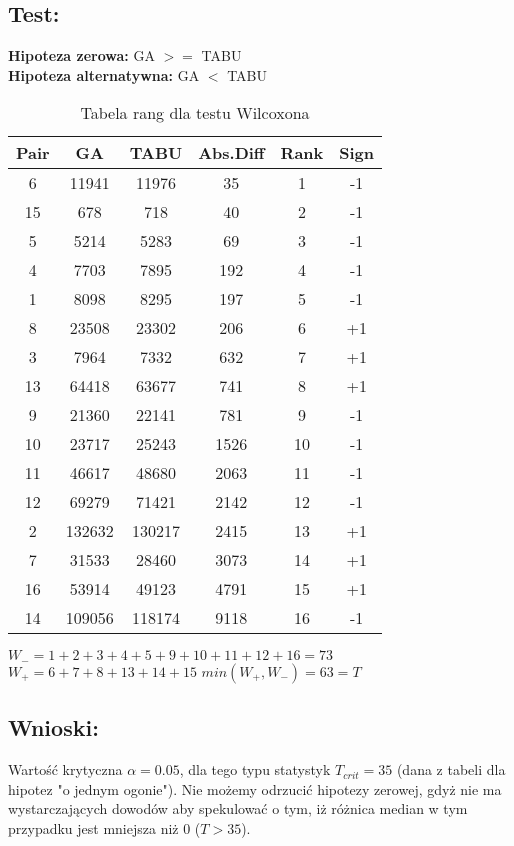   \subsection{Test: }
    \textbf{Hipoteza zerowa: } GA $>=$ TABU \\
    \textbf{Hipoteza alternatywna: } GA $<$ TABU \\
    \begin{table}[!ht]
      \centering
      \begin{tabular}{| c | c | c | c | c | c |}
        \hline
        Pair & GA & TABU & Abs.Diff & Rank & Sign \\
        \hline
        6 & 11941 & 11976 & 35 & 1 & -1 \\
        15 & 678 & 718 & 40 & 2 & -1 \\
        5 & 5214 & 5283 & 69 & 3 & -1 \\
        4 & 7703 & 7895 & 192 & 4 & -1 \\
        1 & 8098 & 8295 & 197 & 5 & -1 \\
        8 & 23508 & 23302 & 206 & 6 & +1 \\
        3 & 7964 & 7332 & 632 & 7 & +1 \\
        13 & 64418 & 63677 & 741 & 8 & +1 \\
        9 & 21360 & 22141 & 781 & 9 & -1 \\
        10 & 23717 & 25243 & 1526 & 10 & -1 \\
        11 & 46617 & 48680 & 2063 & 11 & -1 \\
        12 & 69279 & 71421 & 2142 & 12 & -1 \\
        2 & 132632 & 130217 & 2415 & 13 & +1 \\
        7 & 31533 & 28460 & 3073 & 14 & +1 \\
        16 & 53914 & 49123 & 4791 & 15 & +1 \\
        14 & 109056 & 118174 & 9118 & 16 & -1 \\
        \hline
          
      \end{tabular}
      \caption{Tabela rang dla testu Wilcoxona}
      $W_{-} = 1+2+3+4+5+9+10+11+12+16=73$
      $W_{+} = 6+7+8+13+14+15 $
      $min(W_{+},W_{-}) = 63 = T$
  
    \end{table}
  \subsection{Wnioski: }
    Wartość krytyczna $\alpha = 0.05$, dla tego typu statystyk $T_{crit} = 35$ (dana z tabeli dla hipotez "o jednym ogonie").
    Nie możemy odrzucić hipotezy zerowej, gdyż nie ma wystarczających dowodów aby spekulować o tym, iż różnica median w tym przypadku jest mniejsza niż 0 ($ T > 35$).